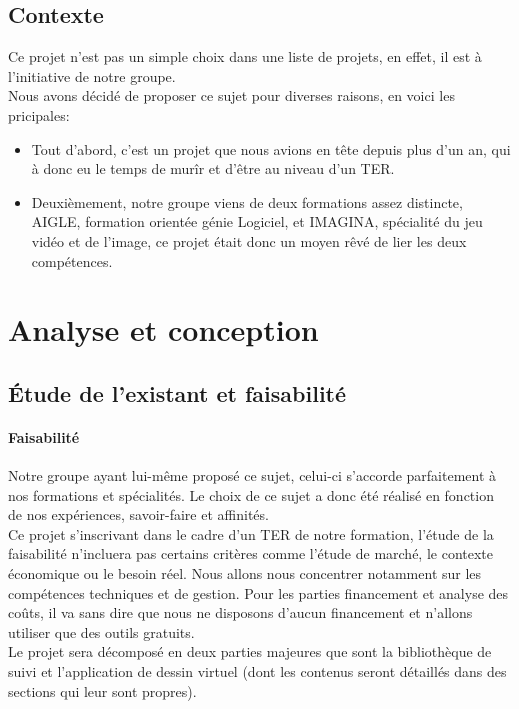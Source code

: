 \documentclass{report}
\begin{document}
		\section{Contexte}
		Ce projet n'est pas un simple choix dans une liste de projets, en effet, il est à l'initiative de notre groupe.\\
		Nous avons décidé de proposer ce sujet pour diverses raisons, en voici les pricipales:
		\begin{itemize}
			\item Tout d'abord, c'est un projet que nous avions en tête depuis plus d'un an, qui à donc eu le temps de murîr et d'être au niveau d'un TER.
			\item Deuxièmement, notre groupe viens de deux formations assez distincte, AIGLE, formation orientée génie Logiciel, et IMAGINA, spécialité du jeu vidéo et de l'image, ce projet était donc un moyen rêvé de lier les deux compétences.
		\end{itemize}	
	\chapter{Analyse et conception}
		\section{Étude de l'existant et faisabilité}
		\subsubsection{Faisabilité}
		Notre groupe ayant lui-même proposé ce sujet, celui-ci s'accorde parfaitement à nos formations et spécialités. Le choix de ce sujet a donc été réalisé en fonction de nos expériences, savoir-faire et affinités.\\
Ce projet s'inscrivant dans le cadre d'un TER de notre formation, l'étude de la faisabilité n'incluera pas certains critères comme l'étude de marché, le contexte économique ou le besoin réel. 
Nous allons nous concentrer notamment sur les compétences techniques et de gestion. Pour les parties financement et analyse des coûts, il va sans dire que nous ne disposons d'aucun financement et n'allons utiliser que des outils gratuits. \\
Le projet sera décomposé en deux parties majeures que sont la bibliothèque de suivi et l'application de dessin virtuel (dont les contenus seront détaillés dans des sections qui leur sont propres).
\end{document}
